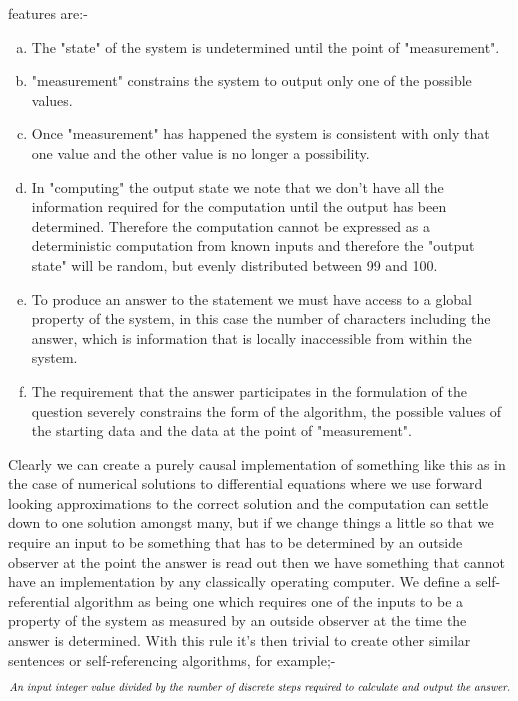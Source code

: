 \documentclass[
   ,final            %
  ]
  {aipproc}
\begin{document}
features are:-
\begin{enumerate}[(a)]
\item %
The "state" of the system is undetermined until the point of "measurement".
\item %
"measurement" constrains the system to output only one of the possible values.
\item %
Once "measurement" has happened the system is consistent with only that one value and the other
value is no longer a possibility.
\item %
In "computing" the output state we note that we don't have all the information required for the
computation until the output has been determined. Therefore the computation cannot be expressed
as a deterministic computation from known inputs and therefore the "output state" will be random, but
evenly distributed between 99 and 100.
\item %
To produce an answer to the statement we must have access to a global property of the system, in this
case the number of characters including the answer, which is information that is locally inaccessible
from within the system.
\item %
The requirement that the answer participates in the formulation of the question severely constrains the
form of the algorithm, the possible values of the starting data and the data at the point of "measurement".
\end{enumerate}
\par
Clearly we can  create a purely causal implementation of something like this as in the case of numerical solutions to differential equations where we %
use forward looking approximations to the correct solution and the
computation can settle down to one solution amongst many, but if we change things a little so that we require an input to be something that has to be %
determined by an outside observer at the point the answer is read out then we have something that cannot have an implementation by any classically %
operating computer. We define a self-referential algorithm as being one which requires one of the inputs to be a property of the system as measured by %
an outside observer at the time the answer is determined. With this rule
it's then trivial to create other similar sentences or self-referencing algorithms, for example;-
\begin{equation}
\text{\emph{An input integer value divided by the number of discrete steps required to calculate and output the answer.}}
\end{equation}
\end{document}
